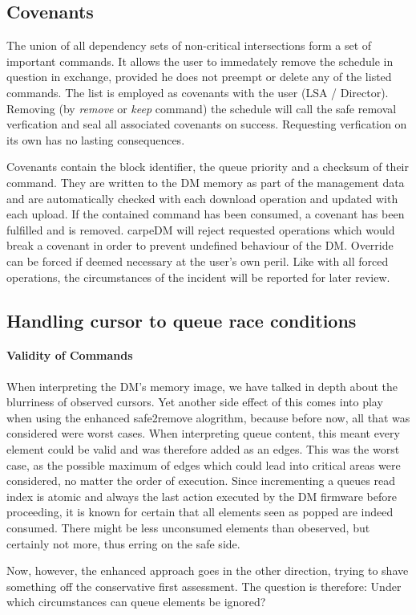 \subsection{Covenants}
\label{ssec:cov}
The union of all dependency sets of non-critical intersections form a set of important commands. It allows the user to immedately remove the schedule in question in exchange, provided he does not preempt or delete any of the listed commands. The list is employed as covenants with the user (LSA / Director).
Removing (by \emph{remove} or \emph{keep} command) the schedule will call the safe removal verfication and seal all associated covenants on success. Requesting verfication on its own has no lasting consequences.
\par
Covenants contain the block identifier, the queue priority and a checksum of their command. They are written to the DM memory as part of the management data and are automatically checked with each download operation and updated with each upload. If the contained command has been consumed, a covenant has been fulfilled and is removed. carpeDM will reject requested operations which would break a covenant in order to prevent undefined behaviour of the DM. Override can be forced if deemed necessary at the user's own peril. Like with all forced operations, the circumstances of the incident will be reported for later review.

\subsection{Handling cursor to queue race conditions}
\paragraph{Validity of Commands}
When interpreting the DM's memory image, we have talked in depth about the blurriness of observed cursors. Yet another side effect of this comes into play when using the enhanced safe2remove alogrithm,
because before now, all that was considered were worst cases. When interpreting queue content, this meant every element could be valid and was therefore added as an edges. This was the worst case, as the possible maximum of edges which could lead into critical areas were considered, no matter the order of execution. Since incrementing a queues read index is atomic and always the last action executed by the DM firmware before proceeding,
it is known for certain that all elements seen as popped are indeed consumed. There might be less unconsumed elements than obeserved, but certainly not more, thus erring on the safe side.
\par Now, however, the enhanced approach goes in the other direction, trying to shave something off the conservative first assessment. The question is therefore: Under which circumstances can queue elements be ignored?


